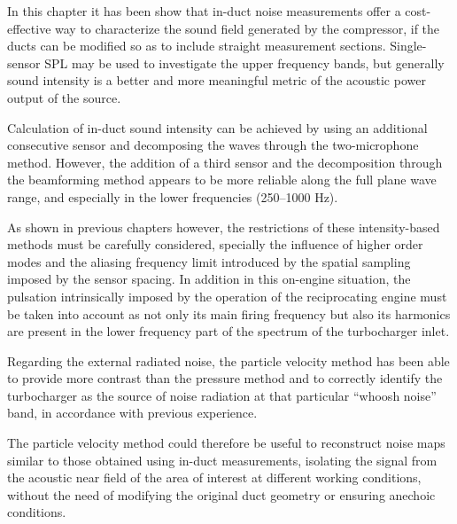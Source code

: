 In this chapter it has been show that in-duct noise measurements offer a cost-effective way to characterize the sound field generated by the compressor, if the ducts can be modified so as to include straight measurement sections. Single-sensor SPL may be used to investigate the upper frequency bands, but generally sound intensity is a better and more meaningful metric of the acoustic power output of the source.

Calculation of in-duct sound intensity can be achieved by using an additional consecutive sensor and decomposing the waves through the two-microphone method. However, the addition of a third sensor and the decomposition through the beamforming method appears to be more reliable along the full plane wave range, and especially in the lower frequencies (250--1000 Hz).

As shown in previous chapters however, the restrictions of these intensity-based methods must be carefully considered, specially the influence of higher order modes and the aliasing frequency limit introduced by the spatial sampling imposed by the sensor spacing. In addition in this on-engine situation, the pulsation intrinsically imposed by the operation of the reciprocating engine must be taken into account as not only its main firing frequency but also its harmonics are present in the lower frequency part of the spectrum of the turbocharger inlet.

Regarding the external radiated noise, the particle velocity method has been able to provide more contrast than the pressure method and to correctly identify the turbocharger as the source of noise radiation at that particular ``whoosh noise'' band, in accordance with previous experience.

The particle velocity method could therefore be useful to reconstruct noise maps similar to those obtained using in-duct measurements, isolating the signal from the acoustic near field of the area of interest at different working conditions, without the need of modifying the original duct geometry or ensuring anechoic conditions.
